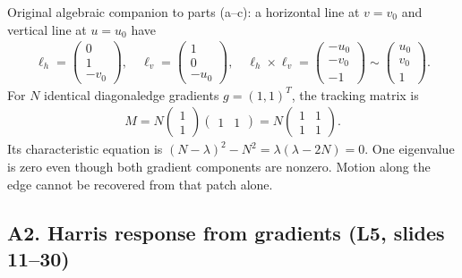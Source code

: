\documentclass[letterpaper,11pt,english,openany,oneside]{jupyterBook}
\begin{document}
\sphinxAtStartPar
Original algebraic companion to parts (a–c): a horizontal line at {\color{QuizMathBlue} \(v=v_0\)} and vertical line at {\color{QuizMathBlue} \(u=u_0\)} have
{\color{QuizMathBlue} \begin{equation*}
\begin{split}
\ell_h=\begin{pmatrix}0\\1\\-v_0\end{pmatrix},\quad\ell_v=\begin{pmatrix}1\\0\\-u_0\end{pmatrix},\quad
\ell_h\times\ell_v=\begin{pmatrix}-u_0\\-v_0\\-1\end{pmatrix}\sim\begin{pmatrix}u_0\\v_0\\1\end{pmatrix}.
\end{split}
\end{equation*}}
\sphinxAtStartPar
For {\color{QuizMathBlue} \(N\)} identical diagonal\sphinxhyphen{}edge gradients {\color{QuizMathBlue} \(g=(1,1)^T\)}, the tracking matrix is
{\color{QuizMathBlue} \begin{equation*}
\begin{split}
M=N\begin{pmatrix}1\\1\end{pmatrix}\begin{pmatrix}1&1\end{pmatrix}
=N\begin{pmatrix}1&1\\1&1\end{pmatrix}.
\end{split}
\end{equation*}}
\sphinxAtStartPar
Its characteristic equation is {\color{QuizMathBlue} \((N-\lambda)^2-N^2=\lambda(\lambda-2N)=0\)}. One eigenvalue is zero even though both gradient components are nonzero. Motion along the edge cannot be recovered from that patch alone.

\par


\subsection{A2. Harris response from gradients (L5, slides 11–30)}
\label{\detokenize{lectures/lecture05/quiz-workbook:a2-harris-response-from-gradients-l5-slides-1130}}\label{\detokenize{lectures/lecture05/quiz-workbook:quiz-source-a2}}
\sphinxAtStartPar
{}
\end{document}
